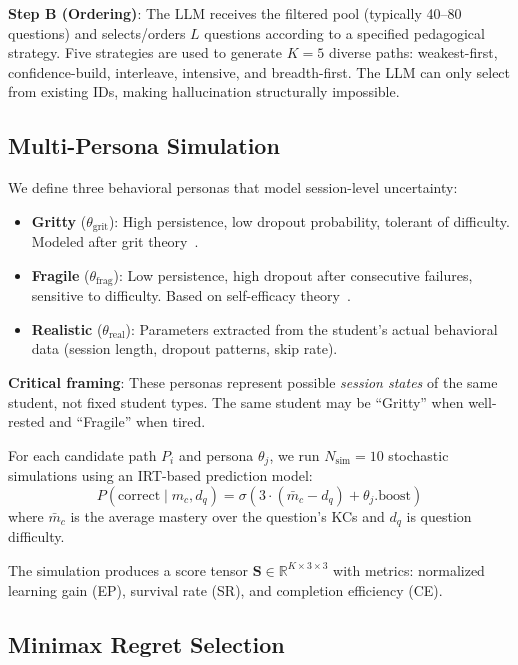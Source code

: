 \documentclass[runningheads]{llncs}
\begin{document}
\textbf{Step B (Ordering)}: The LLM receives the filtered pool (typically 40--80 questions) and selects/orders $L$ questions according to a specified pedagogical strategy. Five strategies are used to generate $K=5$ diverse paths: weakest-first, confidence-build, interleave, intensive, and breadth-first. The LLM can only select from existing IDs, making hallucination structurally impossible.

\subsection{Multi-Persona Simulation}

We define three behavioral personas that model session-level uncertainty:

\begin{itemize}
\item \textbf{Gritty} ($\theta_{\text{grit}}$): High persistence, low dropout probability, tolerant of difficulty. Modeled after grit theory~\cite{duckworth2007}.
\item \textbf{Fragile} ($\theta_{\text{frag}}$): Low persistence, high dropout after consecutive failures, sensitive to difficulty. Based on self-efficacy theory~\cite{bandura1997}.
\item \textbf{Realistic} ($\theta_{\text{real}}$): Parameters extracted from the student's actual behavioral data (session length, dropout patterns, skip rate).
\end{itemize}

\textbf{Critical framing}: These personas represent possible \emph{session states} of the same student, not fixed student types.
The same student may be ``Gritty'' when well-rested and ``Fragile'' when tired.

For each candidate path $P_i$ and persona $\theta_j$, we run $N_{\text{sim}}=10$ stochastic simulations using an IRT-based prediction model:
\begin{equation}
P(\text{correct} \mid m_c, d_q) = \sigma(3 \cdot (\bar{m}_c - d_q) + \theta_j.\text{boost})
\end{equation}
where $\bar{m}_c$ is the average mastery over the question's KCs and $d_q$ is question difficulty.

The simulation produces a score tensor $\mathbf{S} \in \mathbb{R}^{K \times 3 \times 3}$ with metrics: normalized learning gain (EP), survival rate (SR), and completion efficiency (CE).

\subsection{Minimax Regret Selection}
\end{document}
